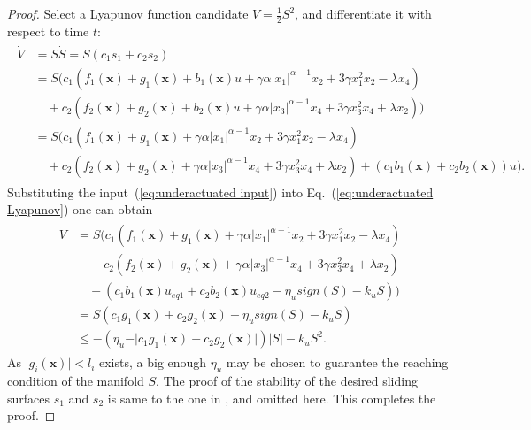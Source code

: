 \documentclass[3p]{elsarticle}
\theoremstyle{plain}
\theoremstyle{remark}
\begin{document}
\begin{proof}
Select a Lyapunov function candidate $V=\frac{1}{2}S^2$, and differentiate it with respect to time $t$:
\begin{align}
\begin{split}
\dot V &= S\dot S = S(c_1\dot s_1+c_2\dot s_2)\\
&=S(c_1(f_1(\bm x)+g_1(\bm x)+b_1(\bm x)u+\gamma\alpha\vert x_1\vert^{\alpha-1}x_2+3\gamma x_1^2x_2-\lambda x_4)\\
&\quad+c_2(f_2(\bm x)+g_2(\bm x)+b_2(\bm x)u+\gamma\alpha\vert x_3\vert^{\alpha-1}x_4+3\gamma x_3^2x_4+\lambda x_2))\\
&=S(c_1(f_1(\bm x)+g_1(\bm x)+\gamma\alpha\vert x_1\vert^{\alpha-1}x_2+3\gamma x_1^2x_2-\lambda x_4)\\
&\quad+c_2(f_2(\bm x)+g_2(\bm x)+\gamma\alpha\vert x_3\vert^{\alpha-1}x_4+3\gamma x_3^2x_4+\lambda x_2)+(c_1b_1(\bm x)+c_2b_2(\bm x))u).\label{eq:underactuated Lyapunov}
\end{split}
\end{align}
Substituting the input~(\ref{eq:underactuated input}) into Eq.~(\ref{eq:underactuated Lyapunov}) one can obtain
\begin{align}
\begin{split}
\dot V &= S(c_1(f_1(\bm x)+g_1(\bm x)+\gamma\alpha\vert x_1\vert^{\alpha-1}x_2+3\gamma x_1^2x_2-\lambda x_4)\\
&\quad+c_2(f_2(\bm x)+g_2(\bm x)+\gamma\alpha\vert x_3\vert^{\alpha-1}x_4+3\gamma x_3^2x_4+\lambda x_2)\\
&\quad+(c_1b_1(\bm x)u_{eq1}+c_2b_2(\bm x)u_{eq2}-\eta_u sign(S)-k_u S))\\
&= S(c_1g_1(\bm x)+c_2g_2(\bm x)-\eta_u sign(S)-k_u S)\\
&\le -(\eta_u -\vert c_1g_1(\bm x)+c_2g_2(\bm x)\vert)\vert S\vert-k_u S^2.
\end{split}
\end{align}
As $\vert g_i(\bm x)\vert<l_i$ exists, a big enough $\eta_u$ may be chosen to guarantee the reaching condition of the manifold $S$. The proof of the stability of the desired sliding surfaces $s_1$ and $s_2$ is same to the one in \cite{wang2004design}, and omitted here. This completes the proof.
\end{proof}
\end{document}
